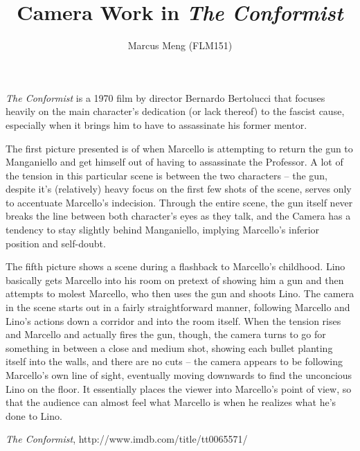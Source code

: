\documentclass{article}
\title{Camera Work in \emph{The Conformist}}
\author{Marcus Meng (FLM151)}
\begin{document}
\maketitle

\emph{The Conformist} is a 1970 film by director Bernardo Bertolucci that focuses heavily on the main character's dedication (or lack thereof) to the fascist cause, especially when it brings him to have to assassinate his former mentor.

The first picture presented is of when Marcello is attempting to return the gun to Manganiello and get himself out of having to assassinate the Professor.
A lot of the tension in this particular scene is between the two characters -- the gun, despite it's (relatively) heavy focus on the first few shots of the scene, serves only to accentuate Marcello's indecision.
Through the entire scene, the gun itself never breaks the line between both character's eyes as they talk, and the Camera has a tendency to stay slightly behind Manganiello, implying Marcello's inferior position and self-doubt.

The fifth picture shows a scene during a flashback to Marcello's childhood.
Lino basically gets Marcello into his room on pretext of showing him a gun and then attempts to molest Marcello, who then uses the gun and shoots Lino.
The camera in the scene starts out in a fairly straightforward manner, following Marcello and Lino's actions down a corridor and into the room itself.
When the tension rises and Marcello and actually fires the gun, though, the camera turns to go for something in between a close and medium shot, showing each bullet planting itself into the walls, and there are no cuts -- the camera appears to be following Marcello's own line of sight, eventually moving downwards to find the unconcious Lino on the floor.
It essentially places the viewer into Marcello's point of view, so that the audience can almost feel what Marcello is when he realizes what he's done to Lino.

\begin{thebibliography}{9}

	\emph{The Conformist}, http://www.imdb.com/title/tt0065571/

\end{thebibliography}
\end{document}

